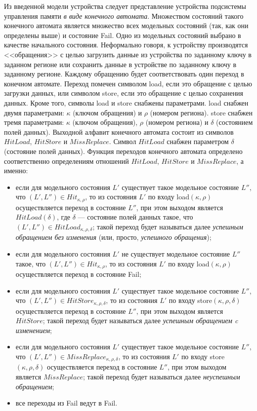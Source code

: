 Из введенной модели устройства следует представление устройства подсистемы управления памяти \emph{в виде конечного автомата}. Множеством состояний такого конечного автомата является множество всех модельных состояний (так, как они определены выше) и состояние Fail. Одно из модельных состояний выбрано в качестве начального состояния. Неформально говоря, к устройству производятся <<обращения>> с целью загрузить данные из устройства по заданному ключу в заданном регионе или сохранить данные в устройстве по заданному ключу в заданному регионе. Каждому обращению будет соответствовать один переход в конечном автомате. Переход помечен символом load, если это обращение с целью загрузки данных, или символом store, если это обращение с целью сохранения данных. Кроме того, символы load и store снабжены параметрами. load снабжен двумя параметрами: $\kappa$ (ключом обращения) и $\rho$ (номером региона). store снабжен тремя параметрами: $\kappa$ (ключом обращения), $\rho$ (номером региона) и $\delta$ (состоянием полей данных). Выходной алфавит конечного автомата состоит из символов $HitLoad$, $HitStore$ и $MissReplace$. Символ $HitLoad$ снабжен параметром $\delta$ (состояние полей данных). Функция переходов конечного автомата определено соответственно определениям отношений $HitLoad$, $HitStore$ и $MissReplace$, а именно:
  \begin{itemize}
    \item если для модельного состояния $L'$ существует такое модельное состояние $L''$, что $(L', L'') \in Hit_{\kappa, \rho}$, то из состояния $L'$ по входу load$(\kappa, \rho)$ осуществляется переход в состояние $L''$, при этом выходом является $HitLoad(\delta)$, где $\delta$ --- состояние полей данных такое, что $(L', L'') \in HitLoad_{\kappa, \rho, \delta}$; такой переход будет называться далее \emph{успешным обращением без изменения} (или, просто, \emph{успешного обращения});
    \item если для модельного состояния $L'$ не существует модельное состояние $L''$ такое, что $(L', L'') \in Hit_{\kappa, \rho}$, то из состояния $L'$ по входу load$(\kappa, \rho)$ осуществляется переход в состояние Fail;
    \item если для модельного состояния $L'$ существует такое модельное состояние $L''$, что $(L', L'') \in HitStore_{\kappa, \rho, \delta}$, то из состояния $L'$ по входу store$(\kappa, \rho, \delta)$ осуществляется переход в состояние $L''$, при этом выходом является\\ $HitStore$; такой переход будет называться далее \emph{успешным обращением c изменением};
    \item если для модельного состояния $L'$ существует такое модельное состояние $L''$, что $(L', L'') \in MissReplace_{\kappa, \rho, \delta}$, то из состояния $L'$ по входу store$(\kappa, \rho, \delta)$ осуществляется переход в состояние $L''$, при этом выходом является $MissReplace$; такой переход будет называться далее \emph{неуспешным обращением};
    \item все переходы из Fail ведут в Fail.
  \end{itemize}

